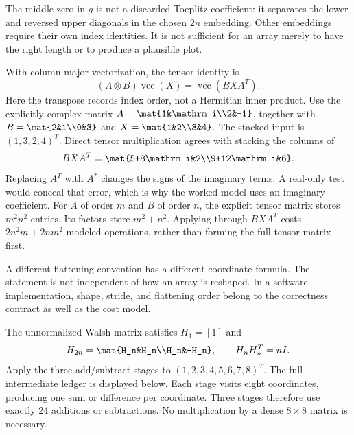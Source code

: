 The middle zero in $g$ is not a discarded Toeplitz coefficient: it separates the lower and reversed upper diagonals in the chosen $2n$ embedding. Other embeddings require their own index identities. It is not sufficient for an array merely to have the right length or to produce a plausible plot.

With column-major vectorization, the tensor identity is
\[
(A\otimes B)\operatorname{vec}(X)=\operatorname{vec}(BXA^T).
\]
Here the transpose records index order, not a Hermitian inner product. Use the explicitly complex matrix $A=\mat{1&\mathrm i\\2&-1}$, together with $B=\mat{2&1\\0&3}$ and $X=\mat{1&2\\3&4}$.
The stacked input is $(1,3,2,4)^T$. Direct tensor multiplication agrees with stacking the columns of
\[
BXA^T=\mat{5+8\mathrm i&2\\9+12\mathrm i&6}.
\]
Replacing $A^T$ with $A^*$ changes the signs of the imaginary terms. A real-only test would conceal that error, which is why the worked model uses an imaginary coefficient.
For $A$ of order $m$ and $B$ of order $n$, the explicit tensor matrix stores $m^2n^2$ entries. Its factors store $m^2+n^2$. Applying through $BXA^T$ costs $2n^2m+2nm^2$ modeled operations, rather than forming the full tensor matrix first.

A different flattening convention has a different coordinate formula. The statement is not independent of how an array is reshaped. In a software implementation, shape, stride, and flattening order belong to the correctness contract as well as the cost model.

The unnormalized Walsh matrix satisfies $H_1=[1]$ and
\[
H_{2n}=\mat{H_n&H_n\\H_n&-H_n},\qquad H_nH_n^T=nI.
\]
Apply the three add/subtract stages to $(1,2,3,4,5,6,7,8)^T$. The full intermediate ledger is displayed below.
Each stage visits eight coordinates, producing one sum or difference per coordinate. Three stages therefore use exactly 24 additions or subtractions. No multiplication by a dense $8\times8$ matrix is necessary.


